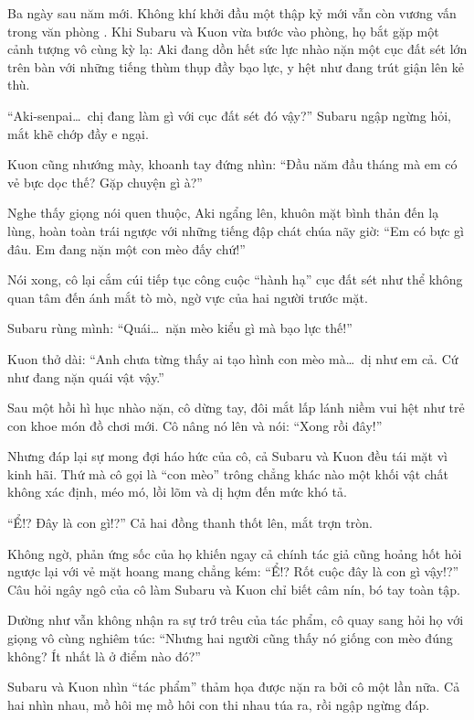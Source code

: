 \documentclass[../main.tex]{subfiles}
\begin{document}
Ba ngày sau năm mới. Không khí khởi đầu một thập kỷ mới vẫn còn vương vấn trong văn phòng \hll. Khi Subaru và Kuon vừa bước vào phòng, họ bắt gặp một cảnh tượng vô cùng kỳ lạ: Aki đang dồn hết sức lực nhào nặn một cục đất sét lớn trên bàn với những tiếng thùm thụp đầy bạo lực, y hệt như đang trút giận lên kẻ thù.


``Aki-senpai\dots\ chị đang làm gì với cục đất sét đó vậy?'' Subaru ngập ngừng hỏi, mắt khẽ chớp đầy e ngại.

Kuon cũng nhướng mày, khoanh tay đứng nhìn: ``Đầu năm đầu tháng mà em có vẻ bực dọc thế? Gặp chuyện gì à?''

Nghe thấy giọng nói quen thuộc, Aki ngẩng lên, khuôn mặt bình thản đến lạ lùng, hoàn toàn trái ngược với những tiếng đập chát chúa nãy giờ: ``Em có bực gì đâu. Em đang nặn một con mèo đấy chứ!''

Nói xong, cô lại cắm cúi tiếp tục công cuộc ``hành hạ'' cục đất sét như thể không quan tâm đến ánh mắt tò mò, ngờ vực của hai người trước mặt.

Subaru rùng mình: ``Quái\dots\ nặn mèo kiểu gì mà bạo lực thế!''

Kuon thở dài: ``Anh chưa từng thấy ai tạo hình con mèo mà\dots\ dị như em cả. Cứ như đang nặn quái vật vậy.''

Sau một hồi hì hục nhào nặn, cô dừng tay, đôi mắt lấp lánh niềm vui hệt như trẻ con khoe món đồ chơi mới. Cô nâng nó lên và nói: ``Xong rồi đây!''

Nhưng đáp lại sự mong đợi háo hức của cô, cả Subaru và Kuon đều tái mặt vì kinh hãi. Thứ mà cô gọi là ``con mèo'' trông chẳng khác nào một khối vật chất không xác định, méo mó, lồi lõm và dị hợm đến mức khó tả.


``Ể!? Đây là con gì!?'' Cả hai đồng thanh thốt lên, mắt trợn tròn.

Không ngờ, phản ứng sốc của họ khiến ngay cả chính tác giả cũng hoảng hốt hỏi ngược lại với vẻ mặt hoang mang chẳng kém: ``Ể!? Rốt cuộc đây là con gì vậy!?'' Câu hỏi ngây ngô của cô làm Subaru và Kuon chỉ biết câm nín, bó tay toàn tập.

Dường như vẫn không nhận ra sự trớ trêu của tác phẩm, cô quay sang hỏi họ với giọng vô cùng nghiêm túc: ``Nhưng hai người cũng thấy nó giống con mèo đúng không? Ít nhất là ở điểm nào đó?''

Subaru và Kuon nhìn ``tác phẩm'' thảm họa được nặn ra bởi cô một lần nữa. Cả hai nhìn nhau, mồ hôi mẹ mồ hôi con thi nhau túa ra, rồi ngập ngừng đáp.
\end{document}
